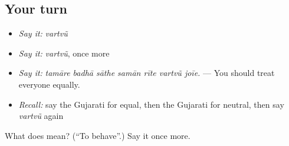 \subsection*{Your turn}
\begin{itemize}
\raggedright
  \item \emph{Say it:} \emph{vartvũ}
  \item \emph{Say it:} \emph{vartvũ}, once more
  \item \emph{Say it:} \emph{tamāre badhā sāthe samān rīte vartvũ joīe.} — You should treat everyone equally.
  \item \emph{Recall:} say the Gujarati for equal, then the Gujarati for neutral, then say \emph{vartvũ} again
\end{itemize}

\begin{tcolorbox}[breakable,colback=teal!4,colframe=teal!35!black,title={Before you move on}]
What does  mean? (\textquotedblleft{}To behave\textquotedblright{}.) Say it once more.
\end{tcolorbox}
